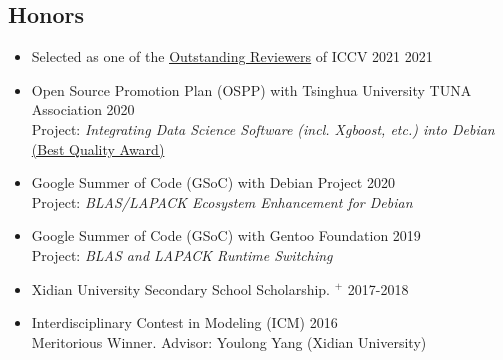 \documentclass[10pt,margin,line,pifont,palatino,courier]{res}
\begin{document}
\begin{resume}
\section{\sc Honors}

\begin{itemize}[leftmargin=*]
	\item Selected as one of the \href{http://iccv2021.thecvf.com/outstanding-reviewers}{\underline{Outstanding Reviewers}} of ICCV 2021 \hfill 2021
	\item Open Source Promotion Plan (OSPP) with Tsinghua University TUNA Association \hfill 2020\\
		Project: \textit{Integrating Data Science Software (incl. Xgboost, etc.) into Debian}\\
		\href{https://isrc.iscas.ac.cn/summer2020/#/announcement}{(Best Quality Award)}
	\item Google Summer of Code (GSoC) with Debian Project \hfill 2020\\
		Project: \textit{BLAS/LAPACK Ecosystem Enhancement for Debian}
	\item Google Summer of Code (GSoC) with Gentoo Foundation \hfill 2019\\
		Project: \textit{BLAS and LAPACK Runtime Switching}
	\item Xidian University Secondary School Scholarship.%
		\href{http://see.xidian.edu.cn/html/news/9732.html}{$^+$} \hfill 2017-2018
	\item Interdisciplinary Contest in Modeling (ICM) \hfill 2016\\
		Meritorious Winner. Advisor: Youlong Yang (Xidian University)
\end{itemize}


\begin{comment}
\section{\sc Skills}


\end{comment}
\end{resume}
\end{document}
